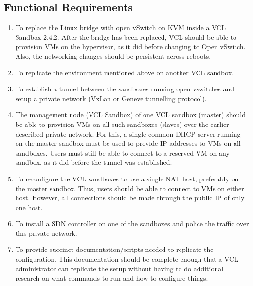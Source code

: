 \documentclass{article}
\begin{document}
\subsection{Functional Requirements}
\begin{enumerate}
    \item To replace the Linux bridge with open vSwitch on KVM inside a VCL Sandbox 2.4.2. After the bridge has been replaced, VCL should be able to provision VMs on the hypervisor, as it did before changing to Open vSwitch. Also, the networking changes should be persistent across reboots.

    \item To replicate the environment mentioned above on another VCL sandbox. 
    
    \item To establish a tunnel between the sandboxes running open vswitches and setup a private network (VxLan or Geneve tunnelling protocol).

    \item The management node (VCL Sandbox) of one VCL sandbox (master) should be able to provision VMs on all such sandboxes (slaves) over the earlier described private network. For this, a single common DHCP server running on the master sandbox must be used to provide IP addresses to VMs on all sandboxes. Users must still be able to connect to a reserved VM on any sandbox, as it did before the tunnel was established. 
    
    \item To reconfigure the VCL sandboxes to use a single NAT host, preferably on the master sandbox. Thus, users should be able to connect to VMs on either host. However, all connections should be made through the public IP of only one host.

    
    
    
    

        
    \item To install a SDN controller on one of the sandboxes and police the traffic over this private network.
    \item To provide succinct documentation/scripts needed to replicate the configuration. This documentation should be complete enough that a VCL administrator can replicate the setup without having to do additional research on what commands to run and how to configure things. 
    
\end{enumerate}
\end{document}
